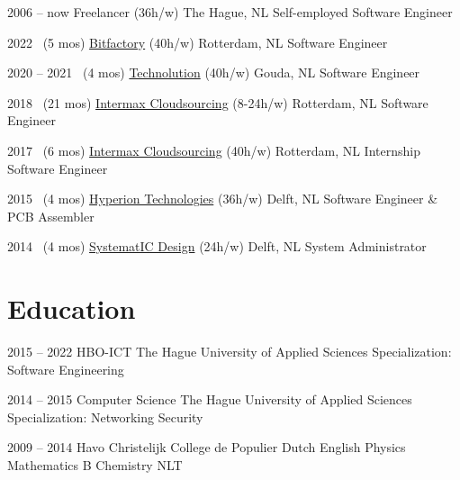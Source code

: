 \documentclass[]{cv-timvisee}
\begin{document}
\begin{entrylist}

\entry
{2006 -- now}
{Freelancer {\footnotesize\normalfont (36h/w)}}
{The Hague, NL}
{Self-employed Software Engineer}

\entry
{2022 ~\hfill \footnotesize(5 mos)}
{\href{https://bitfactory.nl/}{Bitfactory} {\footnotesize\normalfont (40h/w)}}
{Rotterdam, NL}
{Software Engineer}

\entry
{2020 -- 2021 ~\hfill \footnotesize(4 mos)}
{\href{https://technolution.eu/}{Technolution} {\footnotesize\normalfont (40h/w)}}
{Gouda, NL}
{Software Engineer}

\entry
{2018 ~\hfill \footnotesize(21 mos)}
{\href{https://intermax.nl/}{Intermax Cloudsourcing} {\footnotesize\normalfont (8-24h/w)}}
{Rotterdam, NL}
{Software Engineer}

\entry
{2017 ~\hfill \footnotesize(6 mos)}
{\href{https://intermax.nl/}{Intermax Cloudsourcing} {\footnotesize\normalfont (40h/w)}}
{Rotterdam, NL}
{Internship Software Engineer}

\entry
{2015 ~\hfill \footnotesize(4 mos)}
{\href{https://hyperiontechnologies.nl/}{Hyperion Technologies} {\footnotesize\normalfont (36h/w)}}
{Delft, NL}
{Software Engineer \& PCB Assembler}

\entry
{2014 ~\hfill \footnotesize(4 mos)}
{\href{https://systemat-ic.com/}{SystematIC Design} {\footnotesize\normalfont (24h/w)}}
{Delft, NL}
{System Administrator}

\end{entrylist}


\section{Education}

\begin{entrylist}

\entry
{2015 -- 2022}
{HBO-ICT}
{The Hague University of Applied Sciences}
{Specialization: Software Engineering}

\entry
{2014 -- 2015}
{Computer Science}
{The Hague University of Applied Sciences}
{Specialization: Networking \textperiodcentered{} Security}

\entry
{2009 -- 2014}
{Havo}
{Christelijk College de Populier}
{Dutch \textperiodcentered{} English \textperiodcentered{} Physics \textperiodcentered{} Mathematics B \textperiodcentered{} Chemistry \textperiodcentered{} NLT}

\end{entrylist}
\end{document}
